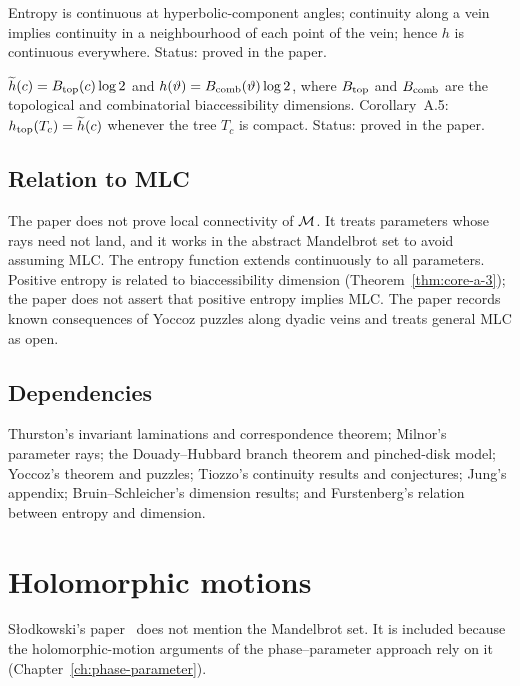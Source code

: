 \begin{theorem}
\label{thm:core-5}
Entropy is continuous at hyperbolic-component angles; continuity along a vein implies continuity in a neighbourhood of
each point of the vein; hence $h$ is continuous everywhere.  Status: proved in the paper.
\end{theorem}

\begin{theorem}
\label{thm:core-a-3}
$\widetilde h(c)=B_{\rm top}(c)\log2$ and $h(\vartheta)=B_{\rm comb}(\vartheta)\log2$, where $B_{\rm top}$ and $B_{\rm comb}$ are
the topological and combinatorial biaccessibility dimensions.  Corollary~A.5: $h_{\rm top}(T_c)=\widetilde h(c)$ whenever the
tree $T_c$ is compact.  Status: proved in the paper.
\end{theorem}

\subsection*{Relation to MLC}

The paper does not prove local connectivity of $\mathcal M$.  It treats parameters whose rays need not land, and it works in the
abstract Mandelbrot set to avoid assuming MLC.  The entropy function extends continuously to all parameters.  Positive
entropy is related to biaccessibility dimension (Theorem~\ref{thm:core-a-3}); the paper does not assert that positive
entropy implies MLC.  The paper records known consequences of Yoccoz puzzles along dyadic veins and treats general MLC as open.

\subsection*{Dependencies}

Thurston's invariant laminations and correspondence theorem; Milnor's parameter rays; the Douady--Hubbard branch theorem and
pinched-disk model; Yoccoz's theorem and puzzles; Tiozzo's continuity results and conjectures; Jung's appendix; Bruin--Schleicher's
dimension results; and Furstenberg's relation between entropy and dimension.

\section{Holomorphic motions}
\label{sec:digest-slodkowski}

Słodkowski's paper~\cite{Slodkowski} does not mention the Mandelbrot set.  It is included because the
holomorphic-motion arguments of the phase--parameter approach rely on it (Chapter~\ref{ch:phase-parameter}).

